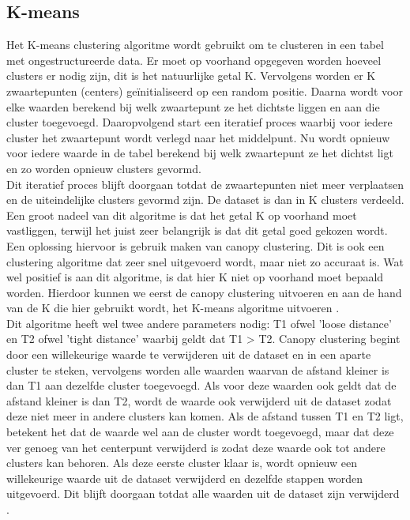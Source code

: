 \subsection{K-means}
Het K-means clustering algoritme wordt gebruikt om te clusteren in een tabel met ongestructureerde data. Er moet op voorhand opgegeven worden hoeveel clusters er nodig zijn, dit is het natuurlijke getal K. Vervolgens worden er K zwaartepunten (centers) geïnitialiseerd op een random positie. Daarna wordt voor elke waarden berekend bij welk zwaartepunt ze het dichtste liggen en aan die cluster toegevoegd. Daaropvolgend start een iteratief proces waarbij voor iedere cluster het zwaartepunt wordt verlegd naar het middelpunt. Nu wordt opnieuw voor iedere waarde in de tabel berekend bij welk zwaartepunt ze het dichtst ligt en zo worden opnieuw clusters gevormd.
\\\indent
Dit iteratief proces blijft doorgaan totdat de zwaartepunten niet meer verplaatsen en de uiteindelijke clusters gevormd zijn. De dataset is dan in K clusters verdeeld. Een groot nadeel van dit algoritme is dat het getal K op voorhand moet vastliggen, terwijl het juist zeer belangrijk is dat dit getal goed gekozen wordt.
\\\indent
Een oplossing hiervoor is gebruik maken van canopy clustering. Dit is ook een clustering algoritme dat zeer snel uitgevoerd wordt, maar niet zo accuraat is. Wat wel positief is aan dit algoritme, is dat hier K niet op voorhand moet bepaald worden. Hierdoor kunnen we eerst de canopy clustering uitvoeren en aan de hand van de K die hier gebruikt wordt, het K-means algoritme uitvoeren \autocite{Vandenbussche2016}.
\\\indent
Dit algoritme heeft wel twee andere parameters nodig: T1 ofwel 'loose distance' en T2 ofwel 'tight distance' waarbij geldt dat T1 > T2. Canopy clustering begint door een willekeurige waarde te verwijderen uit de dataset en in een aparte cluster te steken, vervolgens worden alle waarden waarvan de afstand kleiner is dan T1 aan dezelfde cluster toegevoegd. Als voor deze waarden ook geldt dat de afstand kleiner is dan T2, wordt de waarde ook verwijderd uit de dataset zodat deze niet meer in andere clusters kan komen. Als de afstand tussen T1 en T2 ligt, betekent het dat de waarde wel aan de cluster wordt toegevoegd, maar dat deze ver genoeg van het centerpunt verwijderd is zodat deze waarde ook tot andere clusters kan behoren. Als deze eerste cluster klaar is, wordt opnieuw een willekeurige waarde uit de dataset verwijderd en dezelfde stappen worden uitgevoerd. Dit blijft doorgaan totdat alle waarden uit de dataset zijn verwijderd \autocite{Mahout}.

